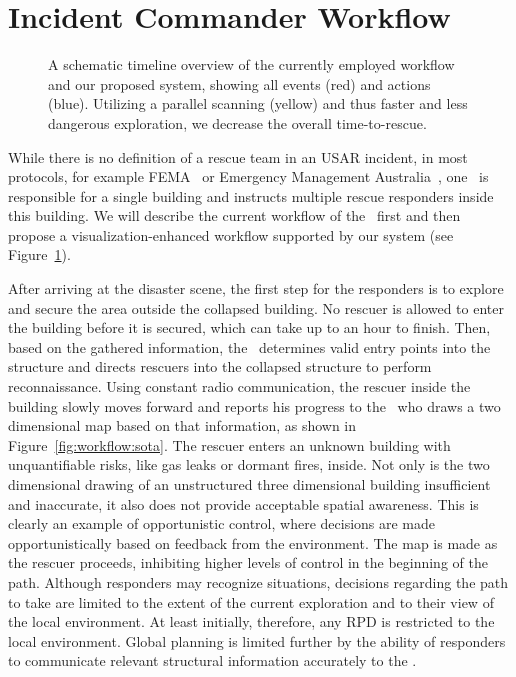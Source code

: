 \section{Incident Commander Workflow} \label{sec:workflow}

\graphicspath{{figures/}}
\begin{figure}
\centering
\def\svgwidth{\columnwidth}

\caption{A schematic timeline overview of the currently employed workflow and our proposed system, showing all events (red) and actions (blue). Utilizing a parallel scanning (yellow) and thus faster and less dangerous exploration, we decrease the overall time-to-rescue.}
\label{fig:workflow:workflow}
\end{figure}

While there is no definition of a rescue team in an USAR incident, in most protocols, for example FEMA~\cite{fema08} or Emergency Management Australia~\cite{em35}, one \IC\ is responsible for a single building and instructs multiple rescue responders inside this building. We will describe the current workflow of the \IC\ first and then propose a visualization-enhanced workflow supported by our system (see Figure~\ref{fig:workflow:workflow}).

 After arriving at the disaster scene, the first step for the responders is to explore and secure the area outside the collapsed building. No rescuer is allowed to enter the building before it is secured, which can take up to an hour to finish. Then, based on the gathered information, the \IC\ determines valid entry points into the structure and directs rescuers into the collapsed structure to perform reconnaissance. Using constant radio communication, the rescuer inside the building slowly moves forward and reports his progress to the \IC\ who draws a two dimensional map based on that information, as shown in Figure~\ref{fig:workflow:sota}. The rescuer enters an unknown building with unquantifiable risks, like gas leaks or dormant fires, inside. Not only is the two dimensional drawing of an unstructured three dimensional building insufficient and inaccurate, it also does not provide acceptable spatial awareness. This is clearly an example of opportunistic control, where decisions are made opportunistically based on feedback from the environment. The map is made as the rescuer proceeds, inhibiting higher levels of control in the beginning of the path. Although responders may recognize situations, decisions regarding the path to take are limited to the extent of the current exploration and to their view of the local environment. At least initially, therefore, any RPD is restricted to the local environment. Global planning is limited further by the ability of responders to communicate relevant structural information accurately to the \IC.

